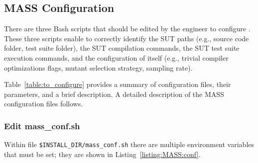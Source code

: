 \subsection{MASS Configuration}

There are three Bash scripts that should be edited by the engineer to configure \MASS. These three scripts enable \MASS to correctly identify the SUT paths (e.g., source code folder, test suite folder), the SUT compilation commands, the SUT test suite execution commands, and the configuration of \MASS itself (e.g., trivial compiler optimizations flags, mutant selection strategy, sampling rate).

Table~\ref{table:to_configure} provides a summary of \MASS configuration files, their parameters, and a brief description. A detailed description of the MASS configuration files follows.









\subsubsection{Edit mass\_conf.sh}

Within file \texttt{\$INSTALL\_DIR/mass\_conf.sh} there are multiple environment variables that must be set; they are shown in Listing~\ref{listing:MASS:conf}.


